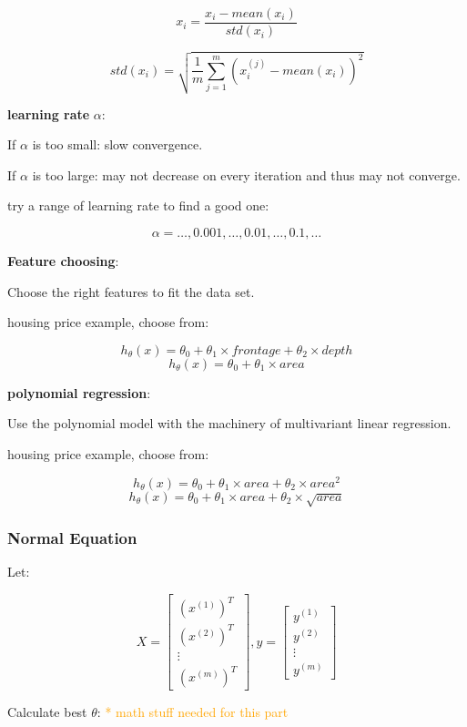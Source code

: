 \documentclass{article}
\begin{document}
\[x_i = \frac{x_i - mean(x_i)}{std(x_i)}\]

\[std(x_i) = \sqrt{ \frac{1}{m} \sum_{j = 1}^m (x^{(j)}_i - mean(x_i))^2}\]

\noindent \textbf{learning rate} \(\alpha\):

\noindent If \(\alpha\) is too small: slow convergence.

\noindent If \(\alpha\) is too large: may not decrease on every iteration and thus may not converge.

\noindent try a range of learning rate to find a good one:

\[\alpha = \dots, 0.001, \dots, 0.01, \dots, 0.1, \dots\]

\noindent \textbf{Feature choosing}:

\noindent Choose the right features to fit the data set.

\noindent housing price example, choose from:

\[h_{\theta}(x) = \theta_0 + \theta_1 \times frontage + \theta_2 \times depth\]
\[h_{\theta}(x) = \theta_0 + \theta_1 \times area\]

\noindent \textbf{polynomial regression}:

\noindent Use the polynomial model with the machinery of multivariant linear regression.

\noindent housing price example, choose from:

\[h_{\theta}(x) = \theta_0 + \theta_1 \times area + \theta_2 \times area^2\]
\[h_{\theta}(x) = \theta_0 + \theta_1 \times area + \theta_2 \times \sqrt{area}\]

\subsubsection{Normal Equation}

\noindent Let:

\[
X = 
\begin{bmatrix}
(x^{(1)})^T\\
(x^{(2)})^T\\
\vdots\\
(x^{(m)})^T
\end{bmatrix}
,
y = 
\begin{bmatrix}
y^{(1)}\\
y^{(2)}\\
\vdots\\
y^{(m)}
\end{bmatrix}
\]

\noindent Calculate best \(\theta\): \textcolor{orange}{ * math stuff needed for this part}
\end{document}
